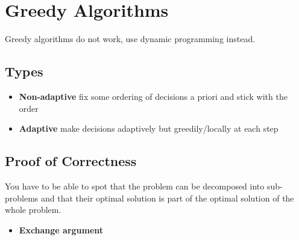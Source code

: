 \section{Greedy Algorithms}

  Greedy algorithms do not work, use dynamic programming instead.

  \subsection{Types}

    \begin{itemize}
      \item \textbf{Non-adaptive} fix some ordering of decisions a priori and
      stick with the order
      \item \textbf{Adaptive} make decisions adaptively but greedily/locally at
      each step
    \end{itemize}

  \subsection{Proof of Correctness}

    You have to be able to spot that the problem can be decomposed into
    sub-problems and that their optimal solution is part of the optimal
    solution of the whole problem.

    \begin{itemize}
      \item \textbf{Exchange argument}
    \end{itemize}
